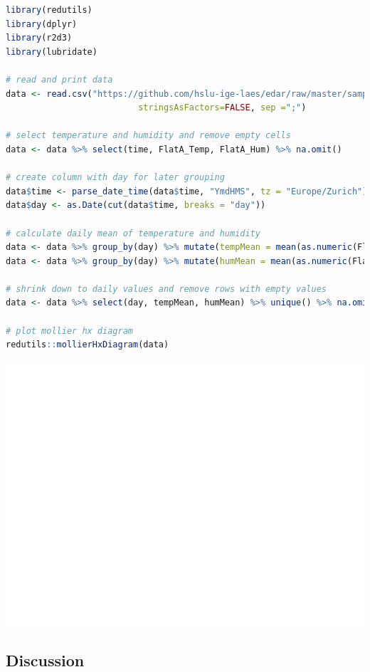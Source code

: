 \documentclass[
]{book}
\begin{document}
\begin{lstlisting}[language=R]
library(redutils)
library(dplyr)
library(r2d3)
library(lubridate)

# read and print data
data <- read.csv("https://github.com/hslu-ige-laes/edar/raw/master/sampleData/flatTempHum.csv",
                          stringsAsFactors=FALSE, sep =";")

# select temperature and humidity and remove empty cells
data <- data %>% select(time, FlatA_Temp, FlatA_Hum) %>% na.omit()

# create column with day for later grouping
data$time <- parse_date_time(data$time, "YmdHMS", tz = "Europe/Zurich")
data$day <- as.Date(cut(data$time, breaks = "day"))

# calculate daily mean of temperature and humidity
data <- data %>% group_by(day) %>% mutate(tempMean = mean(as.numeric(FlatA_Temp))) %>% ungroup()
data <- data %>% group_by(day) %>% mutate(humMean = mean(as.numeric(FlatA_Hum))) %>% ungroup()

# shrink down to daily values and remove rows with empty values
data <- data %>% select(day, tempMean, humMean) %>% unique() %>% na.omit()

# plot mollier hx diagram
redutils::mollierHxDiagram(data)
\end{lstlisting}

\includegraphics{edar_files/figure-latex/mollier hx-1.pdf}

\hypertarget{discussion}{%
\subsection{Discussion}\label{discussion}}
\end{document}
